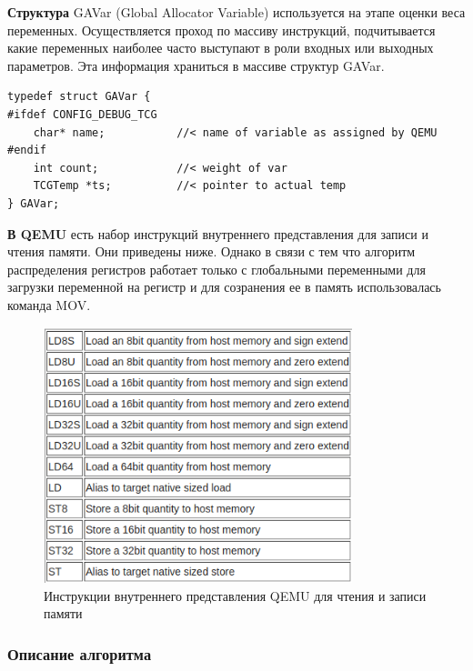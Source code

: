 \textbf{Структура}
GAVar (Global Allocator Variable) используется на этапе оценки веса переменных. Осуществляется проход по массиву инструкций, подчитывается какие переменных наиболее часто выступают в роли входных или выходных параметров. Эта информация храниться в массиве структур GAVar.

\begin{small}
\begin{verbatim}
typedef struct GAVar {
#ifdef CONFIG_DEBUG_TCG
    char* name;           //< name of variable as assigned by QEMU
#endif
    int count;            //< weight of var
    TCGTemp *ts;          //< pointer to actual temp
} GAVar;
\end{verbatim}
\end{small}


\textbf{В QEMU}
есть набор инструкций внутреннего представления для записи и чтения памяти. Они приведены ниже. Однако в связи с тем что алгоритм распределения регистров работает только с глобальными переменными для загрузки переменной на регистр и для созранения ее в память использовалась команда MOV.

\begin{figure}[h!]
    \centering
    \includegraphics[width=0.8\textwidth]{table_load_store.png}
    \caption{Инструкции внутреннего представления QEMU для чтения и записи памяти}
\end{figure}



\subsubsection{Описание алгоритма}

